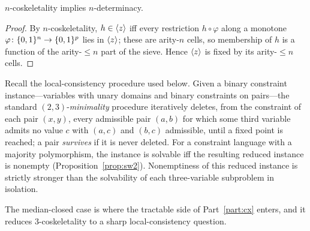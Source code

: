 \begin{prop}\label{prop:cosk}
  $n$-coskeletality implies $n$-determinacy.
\end{prop}
\begin{proof}
  By $n$-coskeletality, $h\in\langle z \rangle$ iff every restriction $h\circ\varphi$
  along a monotone $\varphi\colon\{0,1\}^n\to\{0,1\}^p$ lies in $\langle z \rangle$; these are
  arity-$n$ cells, so membership of $h$ is a function of the arity-$\le n$
  part of the sieve.  Hence $\langle z \rangle$ is fixed by its arity-$\le n$ cells.
\end{proof}

Recall the local-consistency procedure used below.  Given a binary
constraint instance---variables with unary domains and binary constraints
on pairs---the standard $(2,3)$-\emph{minimality} procedure iteratively
deletes, from the constraint of each pair $(x,y)$, every admissible pair
$(a,b)$ for which some third variable admits no value $c$ with $(a,c)$ and
$(b,c)$ admissible, until a fixed point is reached; a pair \emph{survives}
if it is never deleted.  For a constraint language with a majority
polymorphism, the instance is solvable iff the resulting reduced instance
is nonempty (Proposition~\ref{prop:sw2}).  Nonemptiness of this reduced
instance is strictly stronger than the solvability of each three-variable
subproblem in isolation.

The median-closed case is where the tractable side of Part~\ref{part:cx}
enters, and it reduces $3$-coskeletality to a sharp local-consistency
question.

